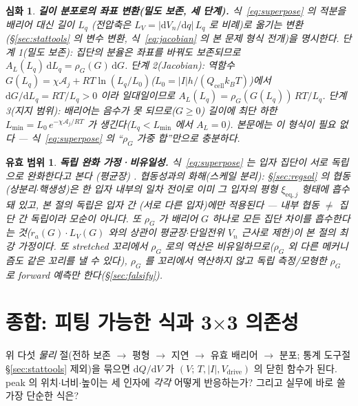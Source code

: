 \documentclass[11pt,a4paper]{article}
\newtheorem*{boundbox}{유효 범위}
\newtheorem*{rigorbox}{심화}
\newcommand{\dd}{\mathrm{d}}
\newcommand{\eq}{\mathrm{eq}}
\newcommand{\drive}{\mathrm{drive}}
\newcommand{\cell}{\mathrm{cell}}
\begin{document}
\begin{rigorbox}
\textbf{길이 분포로의 좌표 변환(밀도 보존, 세 단계).} 식~\eqref{eq:superpose} 의 적분을 배리어 대신 길이 $L_q$
(전압축은 $L_V=|\dd V_n/\dd q|\,L_q$ 로 비례)로 옮기는 변환(\S\ref{sec:stattools} 의 변수 변환, 식~\eqref{eq:jacobian} 의 본 문제 형식 전개)을 명시한다. \emph{단계 1(밀도 보존)}: 집단의 분율은 좌표를 바꿔도 보존되므로 $A_L(L_q)\,\dd L_q=\rho_G(G)\,\dd G$.
\emph{단계 2(Jacobian)}: 역함수 $G(L_q)=\chi\mathcal A_j+RT\ln(L_q/L_0)$($L_0=|I|h/(Q_\cell k_BT)$)에서
$\dd G/\dd L_q=RT/L_q>0$ 이라 일대일이므로 $A_L(L_q)=\rho_G(G(L_q))\,RT/L_q$. \emph{단계 3(지지 범위)}: 배리어는
음수가 못 되므로($G\ge0$) 길이에 최단 하한 $L_{\min}=L_0\,e^{-\chi\mathcal A_j/RT}$ 가 생긴다($L_q<L_{\min}$ 에서
$A_L=0$). 본문에는 이 형식이 필요 없다 — 식~\eqref{eq:superpose} 의 ``$\rho_G$ 가중 합''만으로 충분하다.
\end{rigorbox}
\begin{boundbox}
\textbf{독립 완화 가정·비유일성.} 식~\eqref{eq:superpose} 는 입자 집단이 \emph{서로 독립}으로 완화한다고 본다
(평균장) \cite{funabiki1999}. \emph{협동성과의 화해(스케일 분리)}: \S\ref{sec:regsol} 의 협동(상분리$\cdot$핵생성)은 한
입자 \emph{내부}의 일차 전이로 이미 그 입자의 평형 $\xi_{\eq,j}$ 형태에 흡수돼 있고, 본 절의 독립은 \emph{입자 \emph{간}}
(서로 다른 입자)에만 적용된다 — 내부 협동 $\ne$ 집단 간 독립이라 모순이 아니다. 또 $\rho_G$ 가 배리어 $G$ \emph{하나}로 모든 집단
차이를 흡수한다는 것($r_a(G)\cdot L_V(G)$ 와의 상관이 평균장$\cdot$단일전위 $V_n$ 근사로 제한)이 본 절의 최강 가정이다.
또 stretched 꼬리에서 $\rho_G$ 로의 역산은
\emph{비유일}하므로($\rho_G$ 외 다른 메커니즘도 같은 꼬리를 낼 수 있다), $\rho_G$ 를 꼬리에서 역산하지 않고
독립 측정/모형한 $\rho_G$ 로 \emph{forward 예측}만 한다(\S\ref{sec:falsify}).
\end{boundbox}

\section{종합: 피팅 가능한 식과 3$\times$3 의존성}\label{sec:synth}
위 다섯 \emph{물리} 절(전하 보존 $\to$ 평형 $\to$ 지연 $\to$ 유효 배리어 $\to$ 분포; 통계 도구절
\S\ref{sec:stattools} 제외)을 묶으면 $\dd Q/\dd V$ 가 $(V;\,T,|I|,V_\drive)$ 의 닫힌 함수가 된다. peak 의
위치$\cdot$너비$\cdot$높이는 세 인자에 \emph{각각} 어떻게 반응하는가? 그리고 실무에 바로 쓸 가장 단순한 식은?
\end{document}
